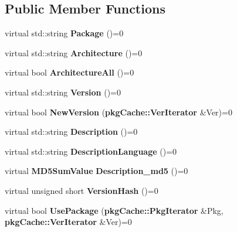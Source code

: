 \subsection*{\-Public \-Member \-Functions}
\begin{DoxyCompactItemize}
\item 
virtual std\-::string {\bfseries \-Package} ()=0\label{classpkgCacheGenerator_1_1ListParser_a2e0b5cd74f84a9edec31ca030134e4f8}

\item 
virtual std\-::string {\bfseries \-Architecture} ()=0\label{classpkgCacheGenerator_1_1ListParser_acf1dd9ea8e5546798bec7b729b773c0c}

\item 
virtual bool {\bfseries \-Architecture\-All} ()=0\label{classpkgCacheGenerator_1_1ListParser_a0218489a9fa787ee8dce5d99baf79c37}

\item 
virtual std\-::string {\bfseries \-Version} ()=0\label{classpkgCacheGenerator_1_1ListParser_afb76862b95ba65a4ee16e15f7afb92da}

\item 
virtual bool {\bfseries \-New\-Version} ({\bf pkg\-Cache\-::\-Ver\-Iterator} \&\-Ver)=0\label{classpkgCacheGenerator_1_1ListParser_ac6f8699a43b22f6081743a07d76f7df6}

\item 
virtual std\-::string {\bfseries \-Description} ()=0\label{classpkgCacheGenerator_1_1ListParser_a27d4c993fe4e0f2f075a14f2585c7f87}

\item 
virtual std\-::string {\bfseries \-Description\-Language} ()=0\label{classpkgCacheGenerator_1_1ListParser_a259b467391afc3006c612e4d97f6a569}

\item 
virtual {\bf \-M\-D5\-Sum\-Value} {\bfseries \-Description\-\_\-md5} ()=0\label{classpkgCacheGenerator_1_1ListParser_a5ee0fdb197e728dd46710f9da0112680}

\item 
virtual unsigned short {\bfseries \-Version\-Hash} ()=0\label{classpkgCacheGenerator_1_1ListParser_a69057f8e3006a1e812832801c899a8f9}

\item 
virtual bool {\bfseries \-Use\-Package} ({\bf pkg\-Cache\-::\-Pkg\-Iterator} \&\-Pkg, {\bf pkg\-Cache\-::\-Ver\-Iterator} \&\-Ver)=0\label{classpkgCacheGenerator_1_1ListParser_a039d6aa626b055198686eba53ed03566}


\end{DoxyCompactItemize}
